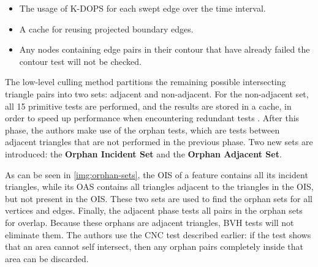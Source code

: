 \begin{itemize}
	\item The usage of K-DOPS for each swept edge over the time interval.
	\item A cache for reusing projected boundary edges.
	\item Any nodes containing edge pairs in their contour that have already failed the contour test will not be checked.
\end{itemize}

The low-level culling method partitions the remaining possible intersecting triangle pairs into two sets: adjacent and non-adjacent. For the non-adjacent set, all 15 primitive tests are performed, and the results are stored in a cache, in order to speed up performance when encountering redundant tests \citep{tang08}. After this phase, the authors make use of the orphan tests, which are tests between adjacent triangles that are not performed in the previous phase. Two new sets are introduced: the \textbf{Orphan Incident Set} and the \textbf{Orphan Adjacent Set}.


As can be seen in \autoref{img:orphan-sets}, the OIS of a feature contains all its incident triangles, while its OAS contains all triangles adjacent to the triangles in the OIS, but not present in the OIS. These two sets are used to find the orphan sets for all vertices and edges. Finally, the adjacent phase tests all pairs in the orphan sets for overlap. Because these orphans are adjacent triangles, BVH tests will not eliminate them. The authors use the CNC test described earlier: if the test shows that an area cannot self intersect, then any orphan pairs completely inside that area can be discarded.


